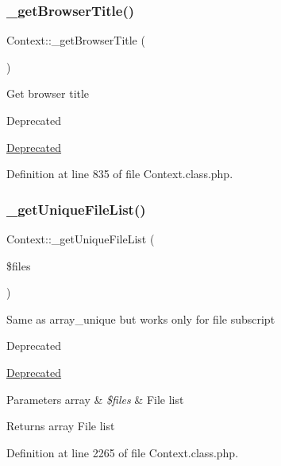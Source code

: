 \subsubsection{\texorpdfstring{\+\_\+get\+Browser\+Title()}{\_getBrowserTitle()}}
{\footnotesize\ttfamily Context\+::\+\_\+get\+Browser\+Title (\begin{DoxyParamCaption}{ }\end{DoxyParamCaption})}

Get browser title \begin{DoxyRefDesc}{Deprecated}
\item[\hyperlink{deprecated__deprecated000001}{Deprecated}]\end{DoxyRefDesc}


Definition at line 835 of file Context.\+class.\+php.

\mbox{\label{classContext_a8bde0f7d77424555f9b856664b59e0bc}} 
\subsubsection{\texorpdfstring{\+\_\+get\+Unique\+File\+List()}{\_getUniqueFileList()}}
{\footnotesize\ttfamily Context\+::\+\_\+get\+Unique\+File\+List (\begin{DoxyParamCaption}\item[{}]{\$files }\end{DoxyParamCaption})}

Same as array\+\_\+unique but works only for file subscript

\begin{DoxyRefDesc}{Deprecated}
\item[\hyperlink{deprecated__deprecated000006}{Deprecated}]\end{DoxyRefDesc}

\begin{DoxyParams}[1]{Parameters}
array & {\em \$files} & File list \\
\hline
\end{DoxyParams}
\begin{DoxyReturn}{Returns}
array File list 
\end{DoxyReturn}


Definition at line 2265 of file Context.\+class.\+php.

\mbox{\label{classContext_a3ad6fc7782e7234fe77357da28218310}} 
